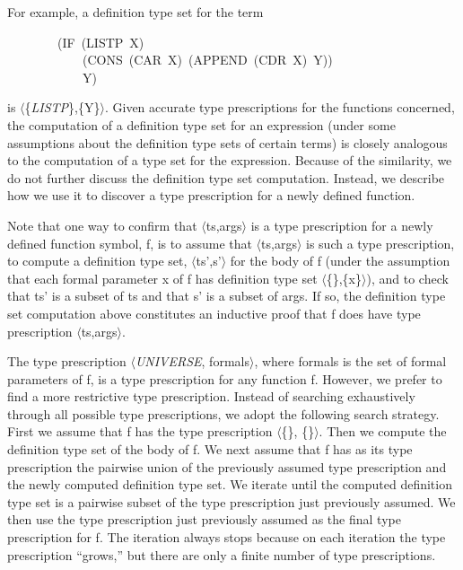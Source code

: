 \documentclass[11pt]{book}
\newenvironment{pubasis}{\begin{flushleft}\ttfamily\small}{\normalsize\rmfamily\end{flushleft}}
\newcommand{\pubinlineunderline}[1]{\emph{#1}}
\begin{document}
For example, a definition type set for the term
\begin{pubasis}
~~~~~~~~(IF~(LISTP~X)\\
~~~~~~~~~~~~(CONS~(CAR~X)~(APPEND~(CDR~X)~Y))\\
~~~~~~~~~~~~Y)\\
\end{pubasis}
is $\langle$\{\pubinlineunderline{LISTP}\},\{Y\}$\rangle$.  Given accurate type prescriptions for
the functions concerned, the computation of a definition type set
for an expression (under some assumptions about the definition type sets
of certain terms) is closely analogous to the computation of a type
set for the expression.  Because of the similarity, we do not
further discuss the definition type set computation.  Instead,
we describe how we use it to discover a type prescription for a newly
defined function.

Note that one way to confirm that $\langle$ts,args$\rangle$ is a type prescription for a
newly defined function symbol, f, is to assume that $\langle$ts,args$\rangle$ is such
a type prescription, to compute a definition type set, $\langle$ts',s'$\rangle$ for the body
of f (under the assumption that each formal parameter x of f has definition
type set $\langle$\{\},\{x\}$\rangle$), and to check that ts' is a subset of
ts and that s' is a subset of args.  If so, the definition type
set computation above  constitutes an
inductive proof that f does have type prescription
$\langle$ts,args$\rangle$.  

The type prescription
$\langle$\pubinlineunderline{UNIVERSE}, formals$\rangle$, where formals is the set of formal
parameters of f, is a type prescription for any function f.
However, we prefer to find
a more restrictive type prescription.  Instead of
searching exhaustively through all possible
type prescriptions, we adopt the following
search strategy.  First we assume that
f has the type prescription $\langle$\{\}, \{\}$\rangle$. 
Then we compute the definition type set
of the body of f.  We next assume that f has
as its type prescription  the
pairwise union of the previously assumed type prescription and the newly computed
definition type set.  We iterate until
the computed definition type set is
a pairwise subset of the type prescription just previously assumed.
We then use the type prescription just previously assumed
as the final type prescription for f.
The iteration always stops because on each
iteration the type prescription ``grows,'' but
there are only a finite number of type prescriptions.
\end{document}
